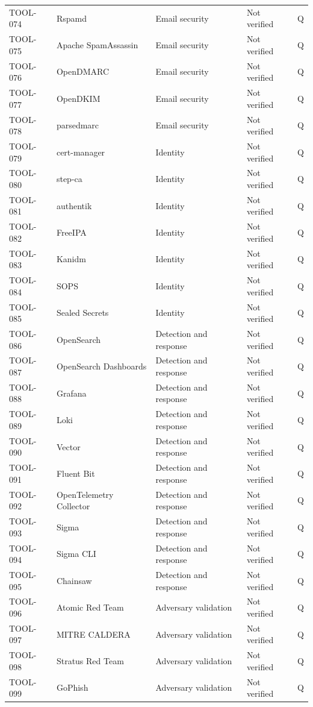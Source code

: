 \documentclass[11pt,oneside]{report}
\begin{document}
\begin{longtable}{P{0.10\textwidth}P{0.32\textwidth}P{0.22\textwidth}P{0.155\textwidth}P{0.055\textwidth}}
TOOL-074 & Rspamd & Email security & Not verified & Q \\
TOOL-075 & Apache SpamAssassin & Email security & Not verified & Q \\
TOOL-076 & OpenDMARC & Email security & Not verified & Q \\
TOOL-077 & OpenDKIM & Email security & Not verified & Q \\
TOOL-078 & parsedmarc & Email security & Not verified & Q \\
TOOL-079 & cert-manager & Identity & Not verified & Q \\
TOOL-080 & step-ca & Identity & Not verified & Q \\
TOOL-081 & authentik & Identity & Not verified & Q \\
TOOL-082 & FreeIPA & Identity & Not verified & Q \\
TOOL-083 & Kanidm & Identity & Not verified & Q \\
TOOL-084 & SOPS & Identity & Not verified & Q \\
TOOL-085 & Sealed Secrets & Identity & Not verified & Q \\
TOOL-086 & OpenSearch & Detection and response & Not verified & Q \\
TOOL-087 & OpenSearch Dashboards & Detection and response & Not verified & Q \\
TOOL-088 & Grafana & Detection and response & Not verified & Q \\
TOOL-089 & Loki & Detection and response & Not verified & Q \\
TOOL-090 & Vector & Detection and response & Not verified & Q \\
TOOL-091 & Fluent Bit & Detection and response & Not verified & Q \\
TOOL-092 & OpenTelemetry Collector & Detection and response & Not verified & Q \\
TOOL-093 & Sigma & Detection and response & Not verified & Q \\
TOOL-094 & Sigma CLI & Detection and response & Not verified & Q \\
TOOL-095 & Chainsaw & Detection and response & Not verified & Q \\
TOOL-096 & Atomic Red Team & Adversary validation & Not verified & Q \\
TOOL-097 & MITRE CALDERA & Adversary validation & Not verified & Q \\
TOOL-098 & Stratus Red Team & Adversary validation & Not verified & Q \\
TOOL-099 & GoPhish & Adversary validation & Not verified & Q \\

\end{longtable}
\end{document}
